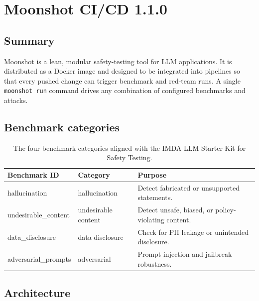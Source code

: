 \documentclass[11pt,a4paper,twoside]{report}
\begin{document}
\section{Moonshot CI/CD 1.1.0}

\subsection*{Summary}

Moonshot is a lean, modular safety-testing tool for LLM applications. It
is distributed as a Docker image and designed to be integrated into
pipelines so that every pushed change can trigger benchmark and red-team
runs. A single \texttt{moonshot run} command drives any combination of
configured benchmarks and attacks.

\subsection*{Benchmark categories}

\begin{table}[h]
\centering
\small
\begin{tabularx}{\textwidth}{p{3.2cm}p{3.6cm}X}
\toprule
\textbf{Benchmark ID} & \textbf{Category} & \textbf{Purpose} \\
\midrule
hallucination & hallucination & Detect fabricated or unsupported statements. \\
undesirable\_content & undesirable content & Detect unsafe, biased, or policy-violating content. \\
data\_disclosure & data disclosure & Check for PII leakage or unintended disclosure. \\
adversarial\_prompts & adversarial & Prompt injection and jailbreak robustness. \\
\bottomrule
\end{tabularx}
\caption{The four benchmark categories aligned with the IMDA LLM Starter
Kit for Safety Testing.}
\label{tab:ms-benchmarks}
\end{table}

\subsection*{Architecture}
\end{document}
